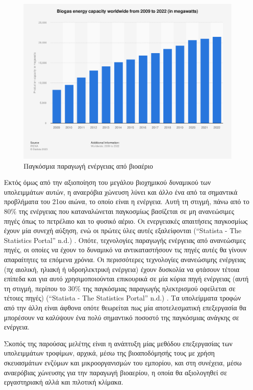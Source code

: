 \documentclass[11pt]{article}
\begin{document}
\begin{figure}[htbp]
\centering
\includegraphics[width=.9\linewidth]{../plots/statistics/statistic_id1032922_global-biogas-energy-capacity-2009-2022.png}
\caption{\label{fig:org929c288}Παγκόσμια παραγωγή ενέργειας από βιοαέριο}
\end{figure}

Εκτός όμως από την αξιοποίηση του μεγάλου βιοχημικού δυναμικού των υπολειμμάτων αυτών, η αναερόβια χώνευση λύνει και άλλο ένα από τα σημαντικά προβλήματα του 21ου αιώνα, το οποίο είναι η ενέργεια. Αυτή τη στιγμή, πάνω από το \(80 \%\) της ενέργειας που καταναλώνεται παγκοσμίως βασίζεται σε μη ανανεώσιμες πηγές όπως το πετρέλαιο και το φυσικό αέριο. Οι ενεργειακές απαιτήσεις παγκοσμίως έχουν μία συνεχή αύξηση, ενώ οι πρώτες ύλες αυτές εξαλείφονται (“Statista - The Statistics Portal” n.d.) . Οπότε, τεχνολογίες παραγωγής ενέργειας από ανανεώσιμες πηγές, οι οποίες να έχουν το δυναμικό να αντικαταστήσουν τις πηγές αυτές θα γίνουν απαραίτητες τα επόμενα χρόνια. Οι περισσότερες τεχνολογίες ανανεώσιμης ενέργειας (πχ αιολική, ηλιακή ή υδροηλεκτρική ενέργεια) έχουν δυσκολία να φτάσουν τέτοια επίπεδα και για αυτό χρησιμοποιούνται επικουρικά σε μία κύρια πηγή ενέργειας (αυτή τη στιγμή, περίπου το \(30 \%\) της παγκόσμιας παραγωγής ηλεκτρισμού οφείλεται σε τέτοιες πηγές) (“Statista - The Statistics Portal” n.d.) . Τα υπολείμματα τροφών από την άλλη είναι άφθονα οπότε θεωρείται πως μία αποτελεσματική επεξεργασία θα μπορέσουν να καλύψουν ένα πολύ σημαντικό ποσοστό της παγκόσμιας ανάγκης σε ενέργεια.

Σκοπός της παρούσας μελέτης είναι η ανάπτυξη μίας μεθόδου επεξεργασίας των υπολειμμάτων τροφίμων, αρχικά, μέσω της βιοαποδόμησής τους με χρήση σκευασμάτων ενζύμων και μικροοργανισμών του εμπορίου, και στη συνέχεια, μέσω αναερόβιας χώνευσης για την παραγωγή βιοαερίου, η οποία θα αξιολογηθεί σε εργαστηριακή αλλά και πιλοτική κλίμακα.
\end{document}
